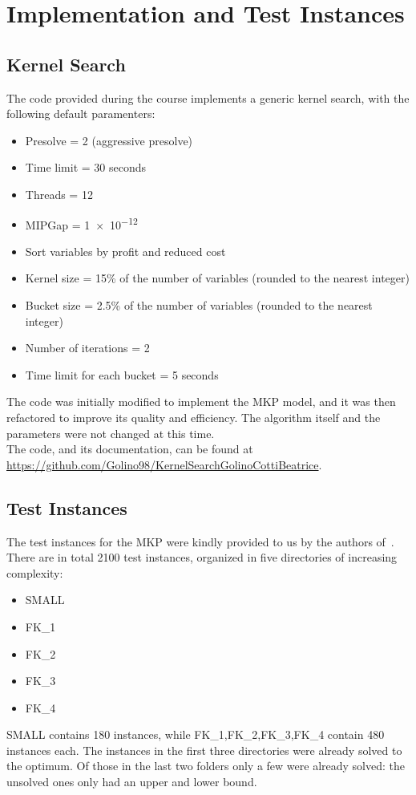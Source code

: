 \chapter{Implementation and Test Instances}


\section{Kernel Search}
The code provided during the course implements a generic kernel search,
with the following default paramenters:
\begin{itemize}
    \item Presolve = 2 (aggressive presolve)
    \item Time limit = 30 seconds
    \item Threads = 12
    \item MIPGap = \num{1e-12}
    \item Sort variables by profit and reduced cost
    \item Kernel size = 15\% of the number of variables (rounded to the nearest integer)
    \item Bucket size = 2.5\% of the number of variables (rounded to the nearest integer)
    \item Number of iterations = 2
    \item Time limit for each bucket = 5 seconds
\end{itemize}
The code was initially modified to implement the MKP model, and it was then
refactored to improve its quality and efficiency.
The algorithm itself and the parameters were not changed at this time.\\
The code, and its documentation, can be found at
\url{https://github.com/Golino98/KernelSearchGolinoCottiBeatrice}.


\section{Test Instances}
The test instances for the MKP were kindly provided to us by the authors of~\cite{mkp:2019}.\\
There are in total 2100 test instances, organized in
five directories of increasing complexity:
\begin{itemize}
    \item SMALL
    \item FK\_1
    \item FK\_2
    \item FK\_3
    \item FK\_4
\end{itemize}
SMALL contains 180 instances, while FK\_1,FK\_2,FK\_3,FK\_4 contain 480 instances each.
The instances in the first three directories were already solved to the optimum.
Of those in the last two folders only a few were already solved: the unsolved
ones only had an upper and lower bound.

